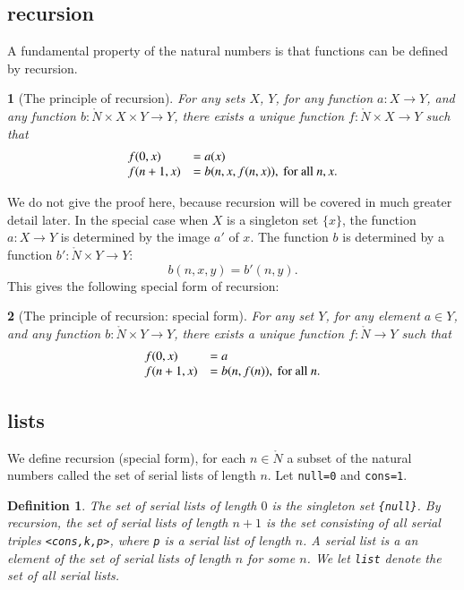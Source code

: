 \documentclass[cup9a]{cupbook}
\newtheorem{assert}{}[chapter]
\newtheorem{definition}{Definition}[chapter]
\begin{document}
\subsection{recursion}

A fundamental property of the natural numbers is that functions can be
defined by recursion.


\begin{assert}[The principle of recursion]  For any sets $X$, $Y$, for any function $a:X\to Y$, and any function $b:\ring{N}\times X\times Y\to Y$, there exists a unique function $f:\ring{N}\times X\to Y$ such that
$$
\begin{array}{lll}
f(0,x) &= a(x)\\
f(n+1,x) &= b(n,x,f(n,x)),\hbox{ for all } n, x.
\end{array}
$$
\end{assert}

We do not give the proof here, because recursion will be covered in much greater detail later.  In the special case when $X$ is a singleton set $\{x\}$, the function $a:X\to Y$ is determined by the image $a'$ of $x$.  The function $b$ is determined by a function $b':\ring{N}\times Y\to Y$:
$$
b(n,x,y) = b'(n,y).
$$
This gives the following special form of recursion:

\begin{assert}[The principle of recursion: special form]  For any set $Y$, for any element $a\in Y$, and any function $b:\ring{N}\times Y\to Y$, there exists a unique function $f:\ring{N}\to Y$ such that
$$
\begin{array}{lll}
f(0,x) &= a\\
f(n+1,x) &= b(n,f(n)),\hbox{ for all } n.
\end{array}
$$
\end{assert}



\subsection{lists}

We define recursion (special form), for each $n\in\ring{N}$ a subset of the natural numbers called the set of serial lists of length $n$.
  Let \verb!null=0! and
\verb!cons=1!.

\begin{definition}
The set of serial lists of length $0$ is the singleton set \verb!{null}!.  By recursion, the set of serial lists of length $n+1$ is the set
consisting of all serial triples \verb!<cons,k,p>!, where \verb!p! is a serial list of length $n$.   A serial list is a an element of the set of serial lists of length $n$ for some $n$.  We let \verb!list! denote the set of all serial lists.
\end{definition}
\end{document}

